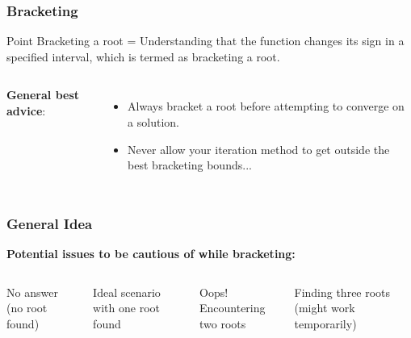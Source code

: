  \begin{frame}[fragile]
    \frametitle{Bracketing}

    \begin{block}{Point}
      Bracketing a root = Understanding that the function changes its sign in a specified interval, which is termed as bracketing a root.
    \end{block}

    \begin{columns}
    \vspace{0.25cm}
     
    
    \textbf{General best advice}:
        \begin{itemize}
          \item Always bracket a root before attempting to converge on a solution.
          \item Never allow your iteration method to get outside the best bracketing bounds...
        \end{itemize}
    \end{columns}
  \end{frame}
  
  \begin{frame}[fragile]
    \frametitle{General Idea}
    
    \textbf{Potential issues to be cautious of while bracketing:}
    \begin{columns}
      \vspace{0.01cm}
      \newline 
      No answer (no root found)
      \vspace{0.8cm}
      
      \vspace{0.01cm}
      \newline 
      Ideal scenario with one root found
      \vspace{0.8cm}
      
      \vspace{0.01cm}
      \newline 
      Oops! Encountering two roots
      \vspace{0.8cm}
      
      \vspace{0.01cm}
      \newline 
      Finding three roots (might work temporarily)
      \vspace{0.8cm}
    \end{columns}
  
  \end{frame}

